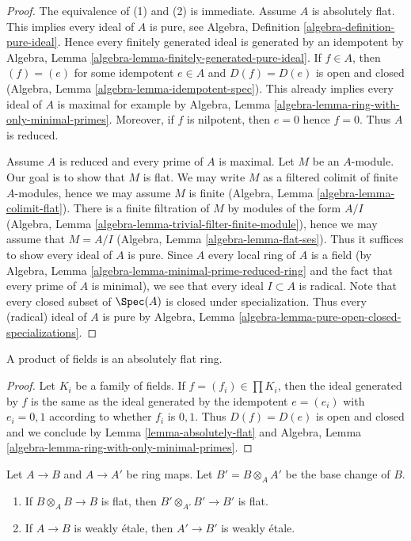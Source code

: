 \begin{proof}
The equivalence of (1) and (2) is immediate.
Assume $A$ is absolutely flat. This implies every ideal of $A$ is pure, see
Algebra, Definition \ref{algebra-definition-pure-ideal}.
Hence every finitely generated ideal is generated by an idempotent by
Algebra, Lemma \ref{algebra-lemma-finitely-generated-pure-ideal}.
If $f \in A$, then $(f) = (e)$ for some idempotent $e \in A$
and $D(f) = D(e)$ is open and closed
(Algebra, Lemma \ref{algebra-lemma-idempotent-spec}).
This already implies every ideal of $A$ is maximal
for example by
Algebra, Lemma \ref{algebra-lemma-ring-with-only-minimal-primes}.
Moreover, if $f$ is nilpotent, then $e = 0$ hence $f = 0$.
Thus $A$ is reduced.

\medskip\noindent
Assume $A$ is reduced and every prime of $A$ is maximal.
Let $M$ be an $A$-module. Our goal is to show that $M$ is flat.
We may write $M$ as a filtered colimit of finite $A$-modules, hence
we may assume $M$ is finite
(Algebra, Lemma \ref{algebra-lemma-colimit-flat}).
There is a finite filtration of $M$ by modules of the form
$A/I$ (Algebra, Lemma \ref{algebra-lemma-trivial-filter-finite-module}),
hence we may assume that $M = A/I$
(Algebra, Lemma \ref{algebra-lemma-flat-ses}).
Thus it suffices to show every ideal of $A$ is pure.
Since $A$ every local ring of $A$ is a field
(by Algebra, Lemma \ref{algebra-lemma-minimal-prime-reduced-ring} and
the fact that every prime of $A$ is minimal),
we see that every ideal $I \subset A$ is radical.
Note that every closed subset of $\Spec(A)$ is closed under specialization.
Thus every (radical) ideal of $A$ is pure by
Algebra, Lemma \ref{algebra-lemma-pure-open-closed-specializations}.
\end{proof}

\begin{lemma}
\label{lemma-product-fields-absolutely-flat}
A product of fields is an absolutely flat ring.
\end{lemma}

\begin{proof}
Let $K_i$ be a family of fields. If $f = (f_i) \in \prod K_i$, then
the ideal generated by $f$ is the same as the ideal generated by
the idempotent $e = (e_i)$ with $e_i = 0, 1$ according to whether
$f_i$ is $0, 1$. Thus $D(f) = D(e)$ is open and closed and we conclude
by Lemma \ref{lemma-absolutely-flat} and
Algebra, Lemma \ref{algebra-lemma-ring-with-only-minimal-primes}.
\end{proof}

\begin{lemma}
\label{lemma-base-change-weakly-etale}
Let $A \to B$ and $A \to A'$ be ring maps. Let $B' = B \otimes_A A'$
be the base change of $B$.
\begin{enumerate}
\item If $B \otimes_A B \to B$ is flat, then $B' \otimes_{A'} B' \to B'$
is flat.
\item If $A \to B$ is weakly \'etale, then $A' \to B'$ is weakly \'etale.
\end{enumerate}
\end{lemma}

